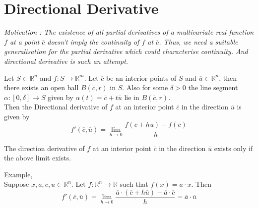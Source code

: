 \section{Directional Derivative}
	\textsl{Motivation : The existence of all partial derivatives of a multivariate real function $f$ at a point $\overline{c}$ doesn't imply the continuity of $f$ at $\overline{c}$. Thus, we need a suitable generalisation for the partial derivative which could characterise continuity. And directional derivative is such an attempt.}

\begin{definition}
	Let \(S \subset \mathbb{R}^n\) and \(f : S \to \mathbb{R}^m\). Let $\overline{c}$ be an interior points of $S$ and \( \overline{u} \in \mathbb{R}^n \), then there exists an open ball $B(\overline{c},r)$ in $S$. Also for some $\delta > 0$ the line segment \( \alpha : [0,\delta] \to S \) given by \( \alpha(t) = \overline{c}+t\overline{u} \) lie in $B(\overline{c},r)$.\\
	
	Then the Directional derivative of $f$ at an interior point $\overline{c}$ in the direction $\overline{u}$ is given by
	\[ f'(\overline{c},\overline{u}) = \lim_{h \to 0} \frac{f(\overline{c}+h\overline{u}) - f(\overline{c})}{h} \]
\end{definition}

\begin{remark}
	The direction derivative of $f$ at an interior point $\overline{c}$ in the direction $\overline{u}$ exists only if the above limit exists.
\end{remark}

\begin{remark}Example, \cite[Exercise 12.2a]{apostol}\\
	Suppose \(\overline{x},\overline{a},\overline{c},\overline{u} \in \mathbb{R}^n\). Let \(f : \mathbb{R}^n \to \mathbb{R}\) such that \(f(\overline{x}) = \overline{a}\cdot\overline{x}\). Then
	\[ f'(\overline{c},\overline{u}) = \lim_{h \to 0} \frac{\overline{a}\cdot(\overline{c}+h\overline{u}) - \overline{a}\cdot\overline{c}}{h} = \overline{a}\cdot\overline{u}\]
\end{remark}

